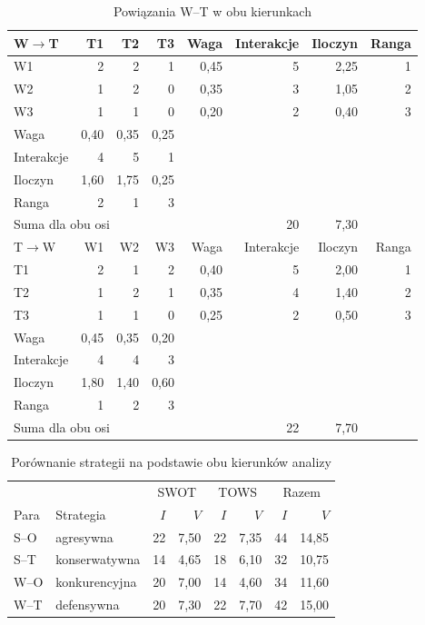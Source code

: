 \documentclass[12pt,a4paper,oneside]{article}
\begin{document}
\begin{table}[H]\centering\small\renewcommand{\arraystretch}{0.96}
\caption{Powiązania W--T w obu kierunkach}
\begin{tabular}{@{}lrrrrrrr@{}}\toprule
W$\to$T & T1 & T2 & T3 & Waga & Interakcje & Iloczyn & Ranga \\
\midrule
W1 & 2 & 2 & 1 & 0,45 & 5 & 2,25 & 1 \\
W2 & 1 & 2 & 0 & 0,35 & 3 & 1,05 & 2 \\
W3 & 1 & 1 & 0 & 0,20 & 2 & 0,40 & 3 \\
Waga & 0,40 & 0,35 & 0,25 &  &  &  &  \\
Interakcje & 4 & 5 & 1 &  &  &  &  \\
Iloczyn & 1,60 & 1,75 & 0,25 &  &  &  &  \\
Ranga & 2 & 1 & 3 &  &  &  &  \\
\multicolumn{5}{l}{Suma dla obu osi} & 20 & 7,30 &  \\
\midrule
T$\to$W & W1 & W2 & W3 & Waga & Interakcje & Iloczyn & Ranga \\
\midrule
T1 & 2 & 1 & 2 & 0,40 & 5 & 2,00 & 1 \\
T2 & 1 & 2 & 1 & 0,35 & 4 & 1,40 & 2 \\
T3 & 1 & 1 & 0 & 0,25 & 2 & 0,50 & 3 \\
Waga & 0,45 & 0,35 & 0,20 &  &  &  &  \\
Interakcje & 4 & 4 & 3 &  &  &  &  \\
Iloczyn & 1,80 & 1,40 & 0,60 &  &  &  &  \\
Ranga & 1 & 2 & 3 &  &  &  &  \\
\multicolumn{5}{l}{Suma dla obu osi} & 22 & 7,70 &  \\
\bottomrule
\end{tabular}\end{table}

\begin{table}[H]\centering\small
\caption{Porównanie strategii na podstawie obu kierunków analizy}\label{tab:strategia}
\begin{tabular}{@{}l l rr rr rr@{}}
\toprule & & \multicolumn{2}{c}{SWOT} & \multicolumn{2}{c}{TOWS} & \multicolumn{2}{c}{Razem} \\
Para & Strategia & $I$ & $V$ & $I$ & $V$ & $I$ & $V$ \\ \midrule
S--O & agresywna & 22 & 7,50 & 22 & 7,35 & 44 & 14,85 \\
S--T & konserwatywna & 14 & 4,65 & 18 & 6,10 & 32 & 10,75 \\
W--O & konkurencyjna & 20 & 7,00 & 14 & 4,60 & 34 & 11,60 \\
W--T & defensywna & 20 & 7,30 & 22 & 7,70 & 42 & 15,00 \\
\bottomrule\end{tabular}\end{table}
\end{document}
